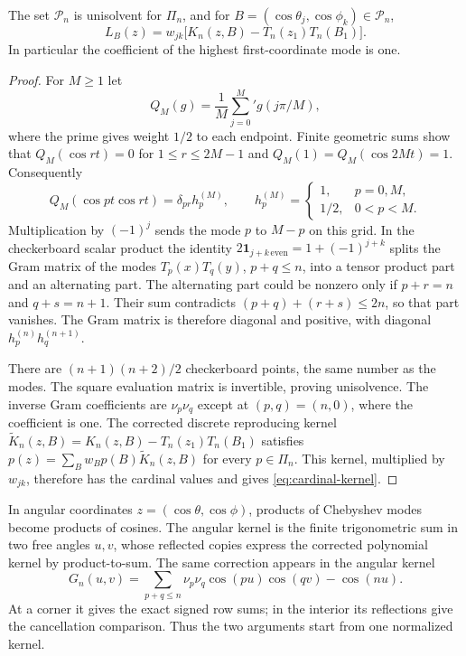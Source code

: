 \begin{lemma}\label{lem:cardinal-kernel}
The set $\mathcal P_n$ is unisolvent for $\Pi_n$, and for
$B=(\cos\theta_j,\cos\phi_k)\in\mathcal P_n$,
\begin{equation}\label{eq:cardinal-kernel}
 L_B(z)=w_{jk}\bigl[K_n(z,B)-T_n(z_1)T_n(B_1)\bigr].
\end{equation}
In particular the coefficient of the highest first-coordinate mode is
one.
\end{lemma}
\begin{proof}
For $M\geq1$ let
\[
 Q_M(g)=\frac1M\sum_{j=0}^M{}'g(j\pi/M),
\]
where the prime gives weight $1/2$ to each endpoint. Finite geometric
sums show that $Q_M(\cos rt)=0$ for $1\leq r\leq2M-1$ and
$Q_M(1)=Q_M(\cos2Mt)=1$. Consequently
\[
 Q_M(\cos pt\cos rt)=\delta_{pr}h_p^{(M)},\qquad
 h_p^{(M)}=\begin{cases}1,&p=0,M,\\1/2,&0<p<M.\end{cases}
\]
Multiplication by $(-1)^j$ sends the mode $p$ to $M-p$ on this grid.
In the checkerboard scalar product the identity
$2\mathbf1_{j+k\,\mathrm{even}}=1+(-1)^{j+k}$ splits the Gram matrix
of the modes $T_p(x)T_q(y)$, $p+q\leq n$, into a tensor product part
and an alternating part. The alternating part could be nonzero only
if $p+r=n$ and $q+s=n+1$. Their sum contradicts
$(p+q)+(r+s)\leq2n$, so that part vanishes.
The Gram matrix is therefore diagonal and positive, with diagonal
$h_p^{(n)}h_q^{(n+1)}$.

There are $(n+1)(n+2)/2$ checkerboard points, the same number as the
modes. The square evaluation matrix is invertible, proving unisolvence.
The inverse Gram coefficients are $\nu_p\nu_q$ except at $(p,q)=(n,0)$,
where the coefficient is one. The corrected discrete reproducing kernel
$\widetilde K_n(z,B)=K_n(z,B)-T_n(z_1)T_n(B_1)$ satisfies
$p(z)=\sum_Bw_Bp(B)\widetilde K_n(z,B)$ for every $p\in\Pi_n$.
This kernel, multiplied
by $w_{jk}$, therefore has the cardinal values and gives
\eqref{eq:cardinal-kernel}.
\end{proof}

In angular coordinates $z=(\cos\theta,\cos\phi)$, products of
Chebyshev modes become products of cosines. The angular kernel is the
finite trigonometric sum in two free angles $u,v$, whose reflected
copies express the corrected polynomial kernel by product-to-sum.
The same correction appears in the angular kernel
\begin{equation}\label{eq:angular-kernel}
 G_n(u,v)=\sum_{p+q\leq n}\nu_p\nu_q\cos(pu)\cos(qv)-\cos(nu).
\end{equation}
At a corner it gives the exact signed row sums; in the interior its
reflections give the cancellation comparison. Thus the two arguments
start from one normalized kernel.



